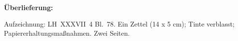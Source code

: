 %
%
%
%
%
\frenchspacing%
%
\begin{ledgroupsized}[r]{120mm}
\footnotesize
\pstart
\noindent\textbf{Überlieferung:}
\pend
\end{ledgroupsized}
\begin{ledgroupsized}[r]{114mm}
\footnotesize
\pstart \parindent -6mm
%
Aufzeichnung: LH~XXXVII~4 Bl.~78.
Ein Zettel (14 x 5 cm);
Tinte verblasst;
Papiererhaltungsmaßnahmen.
Zwei Seiten. 
\pend
\end{ledgroupsized}
%
%
\vspace*{5mm}
